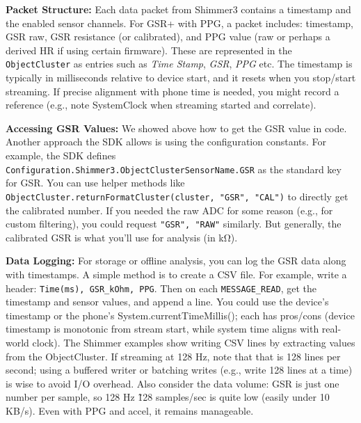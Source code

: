 \textbf{Packet Structure:} Each data packet from Shimmer3 contains a
timestamp and the enabled sensor channels. For GSR+ with PPG, a packet
includes: timestamp, GSR raw, GSR resistance (or calibrated), and PPG
value (raw or perhaps a derived HR if using certain firmware). These are
represented in the \texttt{ObjectCluster} as entries such as \textit{Time Stamp},
\textit{GSR}, \textit{PPG} etc. The timestamp is typically in milliseconds relative to
device start, and it resets when you stop/start streaming. If precise
alignment with phone time is needed, you might record a reference (e.g.,
note SystemClock when streaming started and correlate).

\textbf{Accessing GSR Values:} We showed above how to get the GSR value in
code. Another approach the SDK allows is using the configuration
constants. For example, the SDK defines
\texttt{Configuration.Shimmer3.ObjectClusterSensorName.GSR} as the standard key
for
GSR\cite{InstantStressSmartphone2019}.
You can use helper methods like
\texttt{ObjectCluster.returnFormatCluster(cluster, "GSR", "CAL")} to directly
get the calibrated number. If you needed the raw ADC for some reason
(e.g., for custom filtering), you could request \texttt{"GSR", "RAW"}
similarly. But generally, the calibrated GSR is what you'll use for
analysis (in kΩ).

\textbf{Data Logging:} For storage or offline analysis, you can log the GSR
data along with timestamps. A simple method is to create a CSV file. For
example, write a header: \texttt{Time(ms), GSR_kOhm, PPG}. Then on each
\texttt{MESSAGE_READ}, get the timestamp and sensor values, and append a line.
You could use the device's timestamp or the phone's
System.currentTimeMillis(); each has pros/cons (device timestamp is
monotonic from stream
start\cite{ContactlessStressThermal2022},
while system time aligns with real-world clock). The Shimmer examples
show writing CSV lines by extracting values from the
ObjectCluster\cite{ContactlessStressThermal2022}\cite{InstantStressSmartphone2019}.
If streaming at 128 Hz, note that that is 128 lines per second; using a
buffered writer or batching writes (e.g., write 128 lines at a time) is
wise to avoid I/O overhead. Also consider the data volume: GSR is just
one number per sample, so 128 Hz \~ 128 samples/sec is quite low (easily
under 10 KB/s). Even with PPG and accel, it remains manageable.

